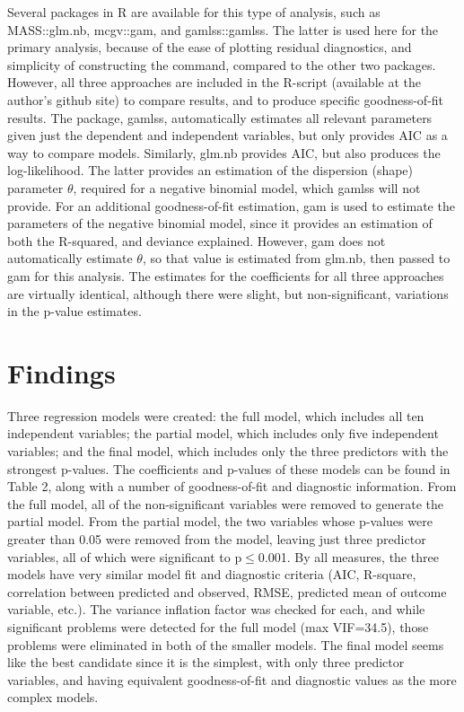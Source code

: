 \documentclass[sigconf]{acmart}
\begin{document}
Several packages in R are available for this type of analysis, such as MASS::glm.nb, mcgv::gam, and gamlss::gamlss.  The latter is used here for the primary analysis, because of the ease of plotting residual diagnostics, and simplicity of constructing the command, compared to the other two packages.  However, all three approaches are included in the R-script (available at the author's github site) to compare results, and to produce specific goodness-of-fit results. \cite{townsley}  The package, gamlss, automatically estimates all relevant parameters given just the dependent and independent variables, but only provides AIC as a way to compare models. \cite{gamlss}  Similarly, glm.nb provides AIC, but also produces the log-likelihood.  The latter provides an estimation of the dispersion (shape) parameter $\theta$, required for a negative binomial model, which gamlss will not provide. For an additional goodness-of-fit estimation, gam is used to estimate the parameters of the negative binomial model, since it provides an estimation of both the R-squared, and deviance explained. \cite{martin16} However, gam does not automatically estimate $\theta$, so that value is estimated from glm.nb, then passed to gam for this analysis.  The estimates for the coefficients for all three approaches are virtually identical, although there were slight, but non-significant, variations in the p-value estimates.

\section{Findings}
Three regression models were created: the full model, which includes all ten independent variables; the partial model, which includes only five independent variables; and the final model, which includes only the three predictors with the strongest p-values.  The coefficients and p-values of these models can be found in Table 2, along with a number of goodness-of-fit and diagnostic information.  From the full model, all of the non-significant variables were removed to generate the partial model.  From the partial model, the two variables whose p-values were greater than 0.05 were removed from the model, leaving just three predictor variables, all of which were significant to p$\leq$0.001. \cite{beaujean16} By all measures, the three models have very similar model fit and diagnostic criteria (AIC, R-square, correlation between predicted and observed, RMSE, predicted mean of outcome variable, etc.).  The variance inflation factor was checked for each, and while significant problems were detected for the full model (max VIF=34.5), those problems were eliminated in both of the smaller models.  The final model seems like the best candidate since it is the simplest, with only three predictor variables, and having equivalent goodness-of-fit and diagnostic values as the more complex models. 
\end{document}

